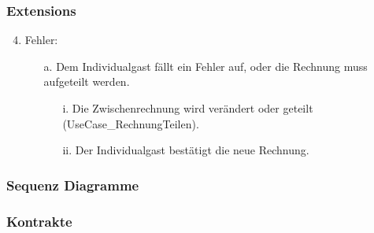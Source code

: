 \documentclass[./detailed_overview_usecases.tex]{subfiles}
\begin{document}
    \subsubsection*{Extensions}
    \begin{enumerate}
        \setcounter{enumi}{3}
        \item Fehler:
        \begin{itemize}
            \item[a.] Dem Individualgast fällt ein Fehler auf, oder die Rechnung muss aufgeteilt werden.
            \begin{itemize}
                \item[i.] Die Zwischenrechnung wird verändert oder geteilt (UseCase_RechnungTeilen).
                \item[ii.] Der Individualgast bestätigt die neue Rechnung.
            \end{itemize}
        \end{itemize}
    \end{enumerate}
    \subsubsection{Sequenz Diagramme}
    \subsubsection{Kontrakte}
\end{document}
